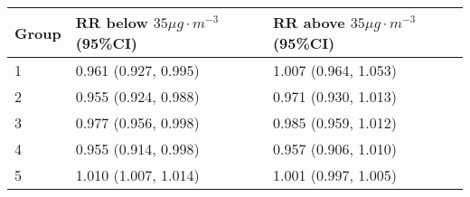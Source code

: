 \begin{tabular}{lll}
  \hline
Group & RR below $35 \mu g \cdot m^{-3}$ (95\%CI) & RR above $35 \mu g \cdot m^{-3}$ (95\%CI) \\ 
  \hline
   1 & 0.961 (0.927, 0.995) & 1.007 (0.964, 1.053) \\ 
     2 & 0.955 (0.924, 0.988) & 0.971 (0.930, 1.013) \\ 
     3 & 0.977 (0.956, 0.998) & 0.985 (0.959, 1.012) \\ 
     4 & 0.955 (0.914, 0.998) & 0.957 (0.906, 1.010) \\ 
     5 & 1.010 (1.007, 1.014) & 1.001 (0.997, 1.005) \\ 
   \hline
\end{tabular}

